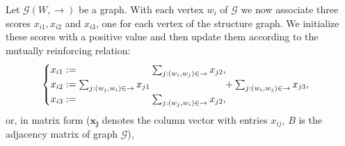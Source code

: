 \documentclass[a4paper,11pt]{report}
\newcommand{\graf}{\mathscr{G}}
\begin{document}
\begin{center}
\end{center}
Let $\graf(W,\to)$ be a graph. With each vertex $w_i$ of $\graf$ we now associate three scores $x_{i1}, x_{i2}$ and 
$x_{i3}$, one for each vertex of the structure graph. We initialize these scores 
with a positive value and then update them according to the mutually reinforcing 
relation:
$$\begin{cases} x_{i1} := \hspace{75px} \sum_{j:(w_i,w_j)\in \to} x_{j2},\\ 
x_{i2} := \sum_{j:(w_j,w_i)\in \to} x_{j1}\hspace{75px} + \sum_{j:(w_i,w_j)\in \to} x_{j3},\\
x_{i3} := \hspace{75px}\sum_{j:(w_j,w_i)\in \to} x_{j2},
\end{cases}$$or, in matrix form ($\mathbf{x_j}$ denotes the column vector with entries $x_{ij}$, $B$ is the adjacency matrix of graph $\graf$),
\end{document}
